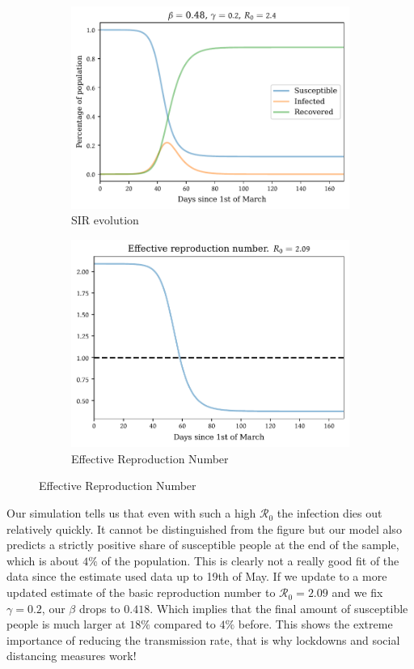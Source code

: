 \documentclass[a4paper,11pt]{article}
\theoremstyle{definition}
\theoremstyle{plain}
\newlength{\twosubht}
\begin{document}
\begin{figure}[htbp]
	\begin{subfigure}[b]{0.48\textwidth}
			\includegraphics[height = \twosubht]{sir_example_files/sir_example_8_0.pdf}
		\caption{SIR evolution}
		\label{fig:sir_simul_first}
	\end{subfigure}
	\begin{subfigure}[b]{0.48\textwidth}
			\includegraphics[height = \twosubht]{sir_example_files/sir_example_20_0.pdf}
		\caption{Effective Reproduction Number}
		\label{fig:effective_R0}
	\end{subfigure}
\end{figure}

Our simulation tells us that even with such a high \(\mathcal{R}_0\) the infection dies out relatively quickly. It cannot be distinguished from the figure but our model also predicts a strictly positive share of susceptible people at the end of the sample, which is about \(4\%\) of the population. This is clearly not a really good fit of the data since the estimate used data up to 19th of May. If we update to a more updated estimate of the basic reproduction number to \(\mathcal{R}_0 = 2.09\) and we fix \(\gamma = 0.2\), our \(\beta\) drops to \(0.418\). Which implies that the final amount of susceptible people is much larger at \(18\%\) compared to \(4\%\) before. This shows the extreme importance of reducing the transmission rate, that is why lockdowns and social distancing measures work!
\end{document}
